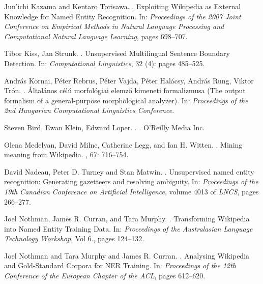\documentclass[11pt]{article}
\begin{document}
\begin{thebibliography}{}
Jun'ichi Kazama and Kentaro Torisawa.
.
\newblock Exploiting Wikipedia as External Knowledge for Named Entity Recognition.
\newblock In: {\em Proceedings of the 2007 Joint Conference on Empirical Methods in Natural Language Processing and Computational Natural Language Learning}, pages 698--707.

Tibor Kiss, Jan Strunk.
.
\newblock Unsupervised Multilingual Sentence Boundary Detection. 
\newblock In: {\em Computational Linguistics}, 32 (4): pages 485--525.

András Kornai, Péter Rebrus, Péter Vajda, Péter Halácsy, András Rung, Viktor Trón.
.
\newblock Általános célú morfológiai elemző kimeneti formalizmusa (The output formalism of a general-purpose morphological analyzer).
\newblock In: {\em Proceedings of the 2nd Hungarian Computational Linguistics Conference}.

Steven Bird, Ewan Klein, Edward Loper.
.
.
\newblock O'Reilly Media Inc.

Olena Medelyan, David Milne, Catherine Legg, and Ian H. Witten.
.
\newblock Mining meaning from Wikipedia.
, 67: 716--754.

David Nadeau, Peter D. Turney and Stan Matwin.
.
\newblock Unsupervised named entity recognition: Generating gazetteers and resolving ambiguity. 
\newblock In: {\em Proceedings of the 19th Canadian Conference on Artificial Intelligence}, volume 4013 of {\em LNCS}, pages 266--277.

Joel Nothman, James R. Curran, and Tara Murphy.
.
\newblock Transforming Wikipedia into Named Entity Training Data.
\newblock In: {\em Proceedings of the Australasian Language Technology Workshop}, Vol 6., pages 124--132.

Joel Nothman and Tara Murphy and James R. Curran.
.
\newblock Analysing Wikipedia and Gold-Standard Corpora for NER Training.
\newblock In: {\em Proceedings of the 12th Conference of the European Chapter of the ACL}, pages 612--620.


\end{thebibliography}
\end{document}
